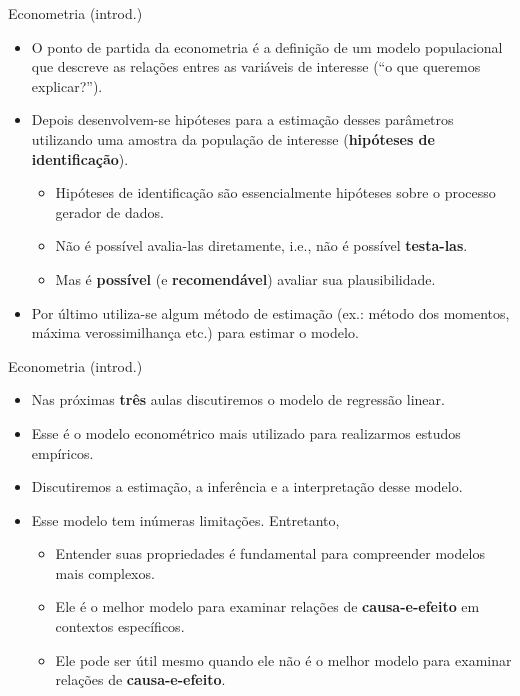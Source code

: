 \documentclass[10pt,slides,xcolor=pdftex,dvipsnames,table]{beamer}
\begin{document}
\begin{frame}{Econometria (introd.)}

\begin{itemize}\itemsep1.2em
	
	\item O ponto de partida da econometria é a definição de um modelo populacional que descreve as relações entres as variáveis de interesse (``o que queremos explicar?'').	  
	
	\item Depois desenvolvem-se hipóteses para a estimação desses parâmetros utilizando uma amostra da população de interesse (\textbf{hipóteses de identificação}).
	\begin{itemize}
	\item Hipóteses de identificação são essencialmente hipóteses sobre o processo gerador de dados.
	\item Não é possível avalia-las diretamente, i.e., não é possível \textbf{testa-las}.
	\item Mas é \textbf{possível} (e \textbf{recomendável}) avaliar sua plausibilidade.
	\end{itemize}
	
	\item Por último utiliza-se algum método de estimação (ex.: método dos momentos, máxima verossimilhança etc.) para estimar o modelo.    

\end{itemize}

\end{frame}


\begin{frame}{Econometria (introd.)}

\begin{itemize}\itemsep1.2em
	
	\item Nas próximas \textbf{três} aulas discutiremos o modelo de regressão linear. 
	
	\item Esse é o modelo econométrico mais utilizado para realizarmos estudos empíricos. 
	
	\item Discutiremos a estimação, a inferência e a interpretação desse modelo.
	
	\item Esse modelo tem inúmeras limitações. Entretanto, 
	
	\begin{itemize}
	\item Entender suas propriedades é fundamental para compreender modelos mais complexos.
	\item Ele é o melhor modelo para examinar relações de \textbf{causa-e-efeito} em contextos específicos.
	\item Ele pode ser útil mesmo quando ele não é o melhor modelo para examinar relações de \textbf{causa-e-efeito}. 
	\end{itemize}

\end{itemize}

\end{frame}
\end{document}
